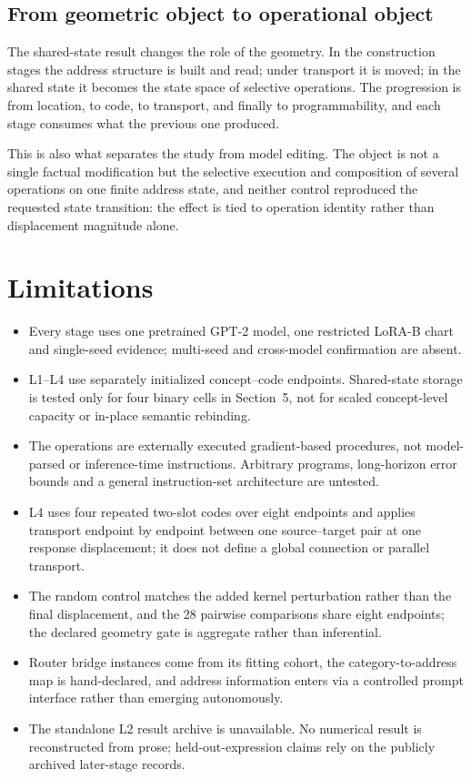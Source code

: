 \documentclass[11pt]{article}
\begin{document}
\subsection{From geometric object to operational object}

The shared-state result changes the role of the geometry. In the construction stages the address structure is
built and read; under transport it is moved; in the shared state it becomes the state space of selective
operations. The progression is from location, to code, to transport, and finally to programmability, and each
stage consumes what the previous one produced.

This is also what separates the study from model editing. The object is not a single factual modification but
the selective execution and composition of several operations on one finite address state, and neither control
reproduced the requested state transition: the effect is tied to operation identity rather than displacement
magnitude alone.

\section{Limitations}

\begin{itemize}
\item Every stage uses one pretrained GPT-2 model, one restricted LoRA-B chart
and single-seed evidence; multi-seed and cross-model confirmation are absent.
\item L1--L4 use separately initialized concept--code endpoints. Shared-state
storage is tested only for four binary cells in Section~5, not for scaled
concept-level capacity or in-place semantic rebinding.
\item The operations are externally executed gradient-based procedures, not
model-parsed or inference-time instructions. Arbitrary programs, long-horizon
error bounds and a general instruction-set architecture are untested.
\item L4 uses four repeated two-slot codes over eight endpoints and applies
transport endpoint by endpoint between one source--target pair at one response
displacement; it does not define a global connection or parallel transport.
\item The random control matches the added kernel perturbation rather than the
final displacement, and the 28 pairwise comparisons share eight endpoints;
the declared geometry gate is aggregate rather than inferential.
\item Router bridge instances come from its fitting cohort, the
category-to-address map is hand-declared, and address information enters via a
controlled prompt interface rather than emerging autonomously.
\item The standalone L2 result archive is unavailable. No numerical result is
reconstructed from prose; held-out-expression claims rely on the publicly
archived later-stage records.
\end{itemize}
\end{document}
